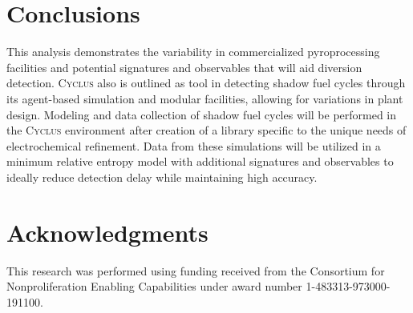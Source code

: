\documentclass{anstrans}
\newcommand{\Cyclus}{\textsc{Cyclus}\xspace}%
\begin{document}
\section{Conclusions}
This analysis demonstrates the variability in commercialized pyroprocessing facilities and potential signatures and observables that will aid diversion detection. \Cyclus also is outlined as tool in detecting shadow fuel cycles through its agent-based simulation and modular facilities, allowing for variations in plant design. Modeling and data collection of shadow fuel cycles will be performed in the \Cyclus environment after creation of a library specific to the unique needs of electrochemical refinement. Data from these simulations will be utilized in a minimum relative entropy model with additional signatures and observables to ideally reduce detection delay while maintaining high accuracy.

\section{Acknowledgments}
This research was performed using funding received from the Consortium for Nonproliferation Enabling Capabilities under award number 1-483313-973000-191100.



\end{document}

